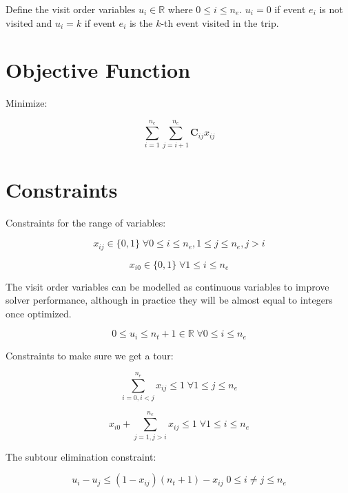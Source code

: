 \documentclass[11pt]{article}
\begin{document}
Define the visit order variables $u_i \in \mathbb{R}$ where $0 \leq i \leq n_e$. $u_i = 0$ if event $e_i$ is not visited and $u_i = k$ if event $e_i$ is the $k$-th event visited in the trip.

\section{Objective Function}
Minimize:

\begin{equation} \label{eq:objective}
\sum_{i=1}^{n_e} \sum_{j=i+1}^{n_e} \mathbf{C}_{ij} x_{ij}
\end{equation}

\section{Constraints}
Constraints for the range of variables:

\begin{equation} \label{constr:x}
    x_{ij} \in \{0, 1\} \; \forall 0 \leq i \leq n_e, 1 \leq j \leq n_e, j > i
\end{equation}

\begin{equation} \label{constr:x_dummy}
    x_{i0} \in \{0, 1\} \; \forall 1 \leq i \leq n_e
\end{equation}

The visit order variables can be modelled as continuous variables to improve solver performance, although in practice they will be almost equal to integers once optimized.

\begin{equation} \label{constr:u}
    0 \leq u_i \leq n_t + 1 \in \mathbb{R} \; \forall 0 \leq i \leq n_e
\end{equation}

Constraints to make sure we get a tour:

\begin{equation} \label{constr:in_edge}
    \sum_{i=0, i < j}^{n_e} x_{ij} \leq 1 \; \forall 1 \leq j \leq n_e
\end{equation}

\begin{equation} \label{constr:out_edge}
    x_{i0} + \sum_{j=1, j > i}^{n_e} x_{ij} \leq 1 \; \forall 1 \leq i \leq n_e
\end{equation}

The subtour elimination constraint:

\begin{equation} \label{constr:order}
    u_i - u_j \leq (1 - x_{ij})(n_t + 1) - x_{ij} \; 0 \leq i \neq j \leq n_e
\end{equation}
\end{document}
